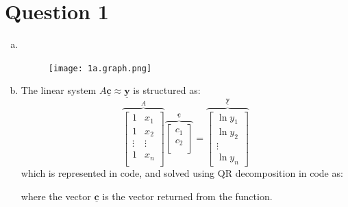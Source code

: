 \documentclass[11pt]{article}
\begin{document}


\section*{Question 1}

\begin{enumerate}[a)]
\item ~
  \begin{figure}[h!]
    \centering
    \texttt{[image: 1a.graph.png]}
  \end{figure}

\item
  The linear system $A \mathbf{\underline{c}} \approx \mathbf{\underline{y}}$ is structured as:
  $$
  \overbrace{
    \begin{bmatrix}
      1&x_1 \\
      1&x_2 \\
      \vdots&\vdots \\
      1&x_n \\
    \end{bmatrix}
  }^A
  \overbrace{
    \begin{bmatrix}
      c_1 \\
      c_2 \\
    \end{bmatrix}
  }^{\mathbf{\underline{c}}}
  =
  \overbrace{
    \begin{bmatrix}
      \ln{y_1} \\
      \ln{y_2} \\
      \vdots \\
      \ln{y_n}
    \end{bmatrix}
  }^{\mathbf{\underline{y}}}
  $$
  which is represented in code, and solved using QR decomposition in code as:
  
  where the vector $\mathbf{\underline{c}}$ is the vector returned from the function.


\end{enumerate}
\end{document}
